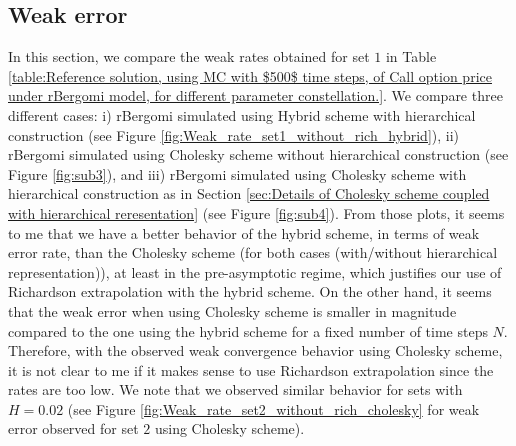 \documentclass[11pt]{article}
\begin{document}
\subsection{Weak error}
In this section, we compare the weak rates obtained for set $1$ in Table
\ref{table:Reference solution, using MC with $500$ time steps, of Call option price under rBergomi model, for different parameter constellation.}. We compare three different cases: i) rBergomi simulated using Hybrid scheme with hierarchical construction (see Figure \ref{fig:Weak_rate_set1_without_rich_hybrid}), ii) rBergomi simulated using Cholesky scheme without hierarchical construction (see Figure \ref{fig:sub3}), and iii) rBergomi simulated using Cholesky scheme with hierarchical construction as in Section \ref{sec:Details of Cholesky scheme coupled with hierarchical reresentation} (see Figure \ref{fig:sub4}). From those plots, it seems to me that we have a better behavior of the hybrid scheme, in terms of weak error rate, than the Cholesky scheme (for both cases (with/without hierarchical representation)), at least in the pre-asymptotic regime, which justifies our use of Richardson extrapolation with the hybrid scheme. On the other hand, it seems that the weak error when using Cholesky scheme is smaller in magnitude compared to the one using the hybrid scheme for a fixed number of time steps $N$. Therefore, with the observed weak convergence behavior using Cholesky scheme, it is not clear to me if it makes sense to use Richardson extrapolation since the rates are too low.  We note that we observed similar behavior for sets with $H=0.02$ (see Figure \ref{fig:Weak_rate_set2_without_rich_cholesky} for weak error observed for set $2$ using Cholesky scheme).
\end{document}
